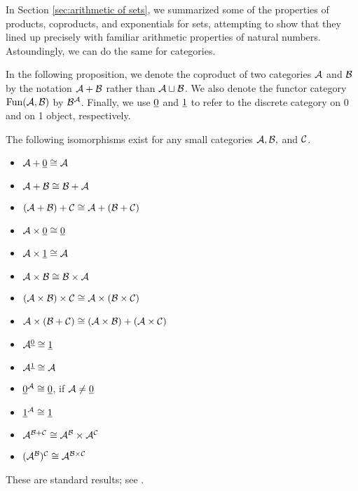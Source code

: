 \documentclass[CT4S-EN-RU]{subfiles}
\begin{document}
\begin{blockENG}
In Section \ref{sec:arithmetic of sets}, we summarized some of the properties of products, coproducts, and exponentials for sets, attempting to show that they lined up precisely with familiar arithmetic properties of natural numbers. Astoundingly, we can do the same for categories.
\end{blockENG}

\begin{blockRUS}
\end{blockRUS}

\begin{blockENG}
In the following proposition, we denote the coproduct of two categories $\mathcal{A}$ and $\mathcal{B}$ by the notation $\mathcal{A}+\mathcal{B}$ rather than $\mathcal{A}\sqcup\mathcal{B}$. We also denote the functor category $\textnormal{Fun}(\mathcal{A},\mathcal{B})$ by $\mathcal{B}^\mathcal{A}$. Finally, we use $\underline{0}$ and $\underline{1}$ to refer to the discrete category on 0 and on 1 object, respectively.
\end{blockENG}

\begin{blockRUS}
\end{blockRUS}

\begin{propositionENG}\label{prop:arithmetic of cats}
The following isomorphisms exist for any small categories $\mathcal{A},\mathcal{B},$ and $\mathcal{C}$.

\begin{itemize}
\item $\mathcal{A}+\underline{0}\cong \mathcal{A}$
\item $\mathcal{A} + \mathcal{B}\cong \mathcal{B} + \mathcal{A}$
\item $(\mathcal{A} + \mathcal{B}) + \mathcal{C} \cong \mathcal{A} + (\mathcal{B} + \mathcal{C})$
\item $\mathcal{A}\times\underline{0}\cong\underline{0}$
\item $\mathcal{A}\times\underline{1}\cong \mathcal{A}$
\item $\mathcal{A}\times \mathcal{B}\cong \mathcal{B}\times \mathcal{A}$
\item $(\mathcal{A}\times\mathcal{B})\times\mathcal{C}\cong\mathcal{A}\times(\mathcal{B}\times\mathcal{C})$
\item $\mathcal{A}\times(\mathcal{B}+\mathcal{C})\cong (\mathcal{A}\times \mathcal{B})+(\mathcal{A}\times \mathcal{C})$
\item $\mathcal{A}^{\underline{0}}\cong \underline{1}$
\item $\mathcal{A}^{\underline{1}}\cong \mathcal{A}$
\item $\underline{0}^\mathcal{A}\cong\underline{0}$,\;\; if $\mathcal{A}\neq\underline{0}$
\item $\underline{1}^\mathcal{A}\cong\underline{1}$
\item $\mathcal{A}^{\mathcal{B}+\mathcal{C}}\cong \mathcal{A}^\mathcal{B}\times \mathcal{A}^\mathcal{C}$
\item $(\mathcal{A}^\mathcal{B})^\mathcal{C}\cong \mathcal{A}^{\mathcal{B}\times \mathcal{C}}$
\end{itemize}
\end{propositionENG}

\begin{propositionRUS}\label{prop:arithmetic of cats}
\end{propositionRUS}

\begin{proofENG}
These are standard results; see \cite{Mac}.
\end{proofENG}

\begin{proofRUS}
\end{proofRUS}
\end{document}
